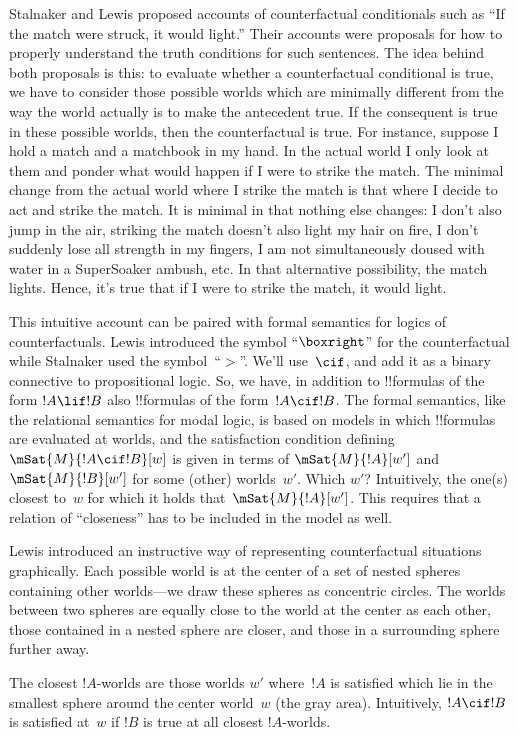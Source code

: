 \documentclass[../../../include/open-logic-section]{subfiles}
\begin{document}

Stalnaker and Lewis proposed accounts of counterfactual conditionals
such as ``If the match were struck, it would light.''  Their accounts
were proposals for how to properly understand the truth conditions for
such sentences. The idea behind both proposals is this: to evaluate
whether a counterfactual conditional is true, we have to consider
those possible worlds which are minimally different from the way the
world actually is to make the antecedent true. If the consequent is
true in these possible worlds, then the counterfactual is true. For
instance, suppose I hold a match and a matchbook in my hand. In the
actual world I only look at them and ponder what would happen if I
were to strike the match. The minimal change from the actual world
where I strike the match is that where I decide to act and strike the
match. It is minimal in that nothing else changes: I don't also jump
in the air, striking the match doesn't also light my hair on fire, I
don't suddenly lose all strength in my fingers, I am not simultaneously
doused with water in a SuperSoaker ambush, etc. In that alternative
possibility, the match lights. Hence, it's true that if I were to
strike the match, it would light.

This intuitive account can be paired with formal semantics for logics
of counterfactuals.  Lewis introduced the symbol ``$\boxright$'' for
the counterfactual while Stalnaker used the symbol~``$>$''. We'll
use~$\cif$, and add it as a binary connective to propositional
logic. So, we have, in addition to !!{formula}s of the form $!A \lif
!B$ also !!{formula}s of the form~$!A \cif !B$. The formal semantics,
like the relational semantics for modal logic, is based on models in
which !!{formula}s are evaluated at worlds, and the satisfaction
condition defining $\mSat{M}{!A \cif !B}[w]$ is given in terms of
$\mSat{M}{!A}[w']$ and $\mSat{M}{!B}[w']$ for some (other)
worlds~$w'$. Which $w'$?  Intuitively, the one(s) closest to~$w$ for
which it holds that~$\mSat{M}{!A}[w']$. This requires that a relation
of ``closeness'' has to be included in the model as well.

Lewis introduced an instructive way of representing counterfactual
situations graphically. Each possible world is at the center of a set
of nested spheres containing other worlds---we draw these spheres as
concentric circles. The worlds between two spheres are equally close
to the world at the center as each other, those contained in a nested
sphere are closer, and those in a surrounding sphere further away.
\begin{center}
\end{center}
The closest $!A$-worlds are those worlds $w'$ where~$!A$ is satisfied
which lie in the smallest sphere around the center world~$w$ (the gray
area). Intuitively, $!A \cif !B$ is satisfied at~$w$ if $!B$ is true
at all closest $!A$-worlds.
\end{document}
